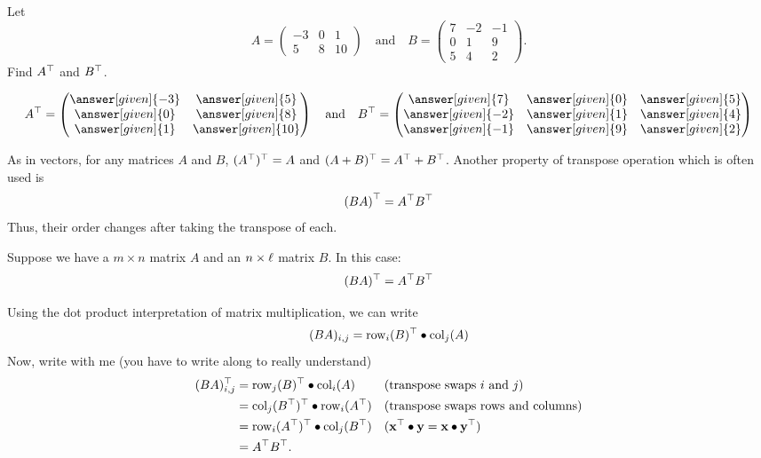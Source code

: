 \documentclass{ximera}
\begin{document}
\begin{question}
Let
\[
  A =
  \begin{pmatrix}
    -3 & 0 & 1\\
    5 & 8 & 10
  \end{pmatrix}
  \quad\text{and}\quad
  B =
  \begin{pmatrix}
    7 & -2 & -1 \\
    0 & 1 & 9 \\
    5 & 4 & 2
  \end{pmatrix}.
\]
Find $A^{\top}$ and $B^{\top}$.

\begin{prompt}
  \[
    A^\transpose =
    \begin{pmatrix}
      \answer[given]{-3} & \answer[given]{5}\\
      \answer[given]{0} & \answer[given]{8}\\
      \answer[given]{1} & \answer[given]{10}
    \end{pmatrix}
    \quad\text{and}\quad
    B^\transpose =
    \begin{pmatrix}
      \answer[given]{7} & \answer[given]{0} & \answer[given]{5}\\
      \answer[given]{-2} & \answer[given]{1} & \answer[given]{4}\\
      \answer[given]{-1} & \answer[given]{9} & \answer[given]{2}
    \end{pmatrix}
  \]
\end{prompt}
\end{question}


As in vectors, for any matrices $A$ and $B$,
$(A^{\top})^{\top} = A$ and $(A+ B)^{\top} =
A^{\top} + B^{\top}$. Another property of transpose
operation which is often used is
\[
\left(BA\right)^{\top} = A^{\top} B^{\top}
\]
Thus, their order changes after taking the transpose of each.



\begin{proposition}
  Suppose we have a $m\times n$ matrix $A$ and an $n\times \ell$ matrix $B$. In this case:
  \[
  (BA)^\top = A^\top B^\top
  \]
  \begin{explanation}
    Using the dot product interpretation of matrix multiplication, we can write
    \[
      (BA)_{i,j} = \operatorname{row}_i(B)^\top \bullet \operatorname{col}_j(A)
    \]
    Now, write with me (you have to write along to really understand)
    \begin{align*}
      (BA)_{i,j}^\top &= \operatorname{row}_j(B)^\top \bullet \operatorname{col}_i(A) & & (\text{transpose swaps $i$ and $j$})\\
      &= \operatorname{col}_j(B^\top)^\top \bullet \operatorname{row}_i(A^\top) & & (\text{transpose swaps rows and columns})\\
      &= \operatorname{row}_i(A^\top)^\top \bullet \operatorname{col}_j(B^\top) & & (\mathbf{x}^\top \bullet \mathbf{y} = \mathbf{x}\bullet \mathbf{y}^\top)\\
      &= A^\top B^\top.
    \end{align*}
  \end{explanation}
\end{proposition}
\end{document}
